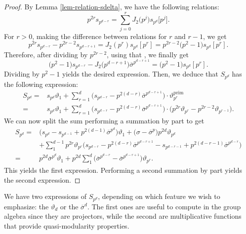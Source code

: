 \documentclass[11pt]{article}
\numberwithin{equation}{section}
\numberwithin{equation}{section}
\theoremstyle{definition}
\begin{document}
\begin{proof}
 By Lemma \ref{lem-relation-sdelta}, we have the following relations:
 \[ p^{2r}s_{p^{d-r}} = \sum_{j=0}^{r} J_2\bigl(p^j\bigr) s_{p^d}\big[p^j\big]. \]
 For $r>0$, making the difference between relations for $r$ and $r-1$, we get
 \[ p^{2r}s_{p^{d-r}}-p^{2r-2}s_{p^{d-r+1}} = J_2(p^r)s_{p^d}[p^r] = p^{2r-2}\bigl(p^2-1\bigr)s_{p^d}[p^r]. \]
 Therefore, after dividing by $p^{2r-2}$, using that , we finally get
 \[ \bigl(p^2-1\bigr)s_{p^{d-r}} -J_2\bigl(p^{d-r+1}\bigr)\overline{\sigma}^{p^{d-r+1}} = \bigl(p^2-1\bigr)s_{p^d}[p^r]. \]
 Dividing by $p^2-1$ yields the desired expression. Then, we deduce that $S_{p^d}$ has the following expression:
 \begin{align*}
 S_{p^d} ={} & s_{p^d}\vartheta_1 + \sum_{r=1}^d \bigl(s_{p^{d-r}}-p^{2(d-r)}\overline{\sigma}^{p^{d-r+1}} \bigr)\cdot \vartheta_{p^r}^\mathrm{prim} \\
 ={} & s_{p^d}\vartheta_1 + \sum_{r=1}^d \bigl(s_{p^{d-r}}-p^{2(d-r)}\overline{\sigma}^{p^{d-r+1}} \bigr)\cdot \bigl(p^{2r}\vartheta_{p^r}-p^{2r-2}\vartheta_{p^{r-1}} \bigr).
 \end{align*}
 We can now split the sum performing a summation by part to get
 \begin{align*}
 S_{p^d}= {}& \bigl(s_{p^d}-s_{p^{d-1}}+p^{2(d-1)}\overline{\sigma}^{p^d}\bigr)\vartheta_1 +\bigl(\sigma-\overline{\sigma}^p\bigr)p^{2d}\vartheta_{p^d} \\
 & + \sum_1^{d-1} p^{2r}\vartheta_{p^r} \bigl(s_{p^{d-r}} -p^{2(d-r)}\overline{\sigma}^{p^{d-r+1}}-s_{p^{d-r-1}}+p^{2(d-r-1)}\overline{\sigma}^{p^{d-r}} \bigr) \\
 ={} & p^{2d}\overline{\sigma}^{p^d}\vartheta_1 +p^{2d}\sum_1^d \bigl(\overline{\sigma}^{p^{d-r}} - \overline{\sigma}^{p^{d-r+1}} \bigr)\vartheta_{p^r}.
 \end{align*}
 This yields the first expression. Performing a second summation by part yields the second expression.
\end{proof}

We have two expressions of $S_{p^d}$, depending on which feature we wish to emphasize: the $\vartheta_d$ or the $\overline{\sigma}^d$. The first ones are useful to compute in the group algebra since they are projectors, while the second are multiplicative functions that provide quasi-modularity properties.
\end{document}
